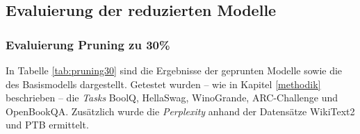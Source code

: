 \newpage

\subsection{Evaluierung der reduzierten Modelle}

\subsubsection{Evaluierung Pruning zu 30\%}\label{evaluation-30}

In Tabelle \ref{tab:pruning30} sind die Ergebnisse der geprunten Modelle sowie
die des Basismodells dargestellt. Getestet wurden – wie in Kapitel
\ref{methodik} beschrieben – die \emph{Tasks} BoolQ, HellaSwag, WinoGrande,
ARC-Challenge und OpenBookQA. Zusätzlich wurde die \emph{Perplexity} anhand der
Datensätze WikiText2 und PTB ermittelt.


